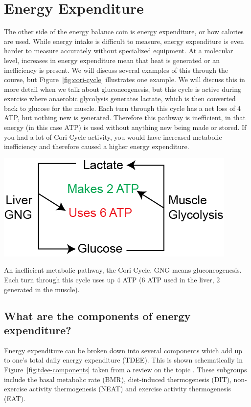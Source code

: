 \documentclass{tufte-handout}
\begin{document}
\section{Energy Expenditure}

The other side of the energy balance coin is energy expenditure, or how calories are used.  While energy intake is difficult to measure, energy expenditure is even harder to measure accurately without specialized equipment.  At a molecular level, increases in energy expenditure mean that heat is generated or an inefficiency is present.  We will discuss several examples of this through the course, but Figure~\ref{fig:cori-cycle} illustrates one example.  We will discuss this in more detail when we talk about gluconeogenesis, but this cycle is active during exercise where anaerobic glycolysis generates lactate, which is then converted back to glucose for the muscle.  Each turn through this cycle has a net loss of 4 ATP, but nothing new is generated.  Therefore this pathway is inefficient, in that energy (in this case ATP) is used without anything new being made or stored.  If you had a lot of Cori Cycle activity, you would have increased metabolic inefficiency and therefore caused a higher energy expenditure.

\begin{marginfigure}
\includegraphics{figures/cori-cycle.png}
\caption{An inefficient metabolic pathway, the Cori Cycle.  GNG means gluconeogenesis.  Each turn through this cycle uses up 4 ATP (6 ATP used in the liver, 2 generated in the muscle).}\label{fig:cori-cycle}
\end{marginfigure}


\subsection{What are the components of energy expenditure?}
Energy expenditure can be broken down into several components which add up to one's total daily energy expenditure (TDEE).  This is shown schematically in Figure~\ref{fig:tdee-components} taken from a review on the topic \citep{Tam2015}.  These subgroups include the basal metabolic rate (BMR), diet-induced thermogenesis (DIT), non-exercise activity thermogenesis (NEAT) and exercise activity thermogenesis (EAT).  
\end{document}
